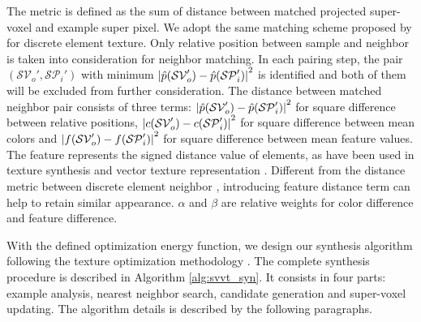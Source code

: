 The metric is defined as the sum of distance between matched projected super-voxel and example super pixel. We adopt the same matching scheme proposed by \cite{ma2011discrete} for discrete element texture. Only relative position between sample and neighbor is taken into consideration for neighbor matching. In each pairing step, the pair $(\mathcal{SV}_o',\mathcal{SP}_i')$ with minimum ${\arrowvert \hat{p}(\mathcal{SV}_o') - \hat{p}(\mathcal{SP}_i') \arrowvert}^2$ is identified and both of them will be excluded from further consideration. The distance between matched neighbor pair consists of three terms: ${\arrowvert \hat{p}(\mathcal{SV}_o') - \hat{p}(\mathcal{SP}_i') \arrowvert}^2$ for square difference between relative positions, ${\arrowvert c(\mathcal{SV}_o') - c(\mathcal{SP}_i') \arrowvert}^2$ for square difference between mean colors and ${\arrowvert f(\mathcal{SV}_o') - f(\mathcal{SP}_i') \arrowvert}^2$ for square difference between mean feature values. The feature represents the signed distance value of elements, as have been used in texture synthesis \cite{lefebvre2006appearance,kopf2007solid} and vector texture representation \cite{wang2010vector}. Different from the distance metric between discrete element neighbor \cite{ma2011discrete}, introducing feature distance term can help to retain similar appearance. $\alpha$ and $\beta$ are relative weights for color difference and feature difference.

With the defined optimization energy function, we design our synthesis algorithm following the texture optimization methodology \cite{kwatra2005texture}. The complete synthesis procedure is described in Algorithm \ref{alg:svvt_syn}. It consists in four parts: example analysis, nearest neighbor search, candidate generation and super-voxel updating. The algorithm details is described by the following paragraphs.

